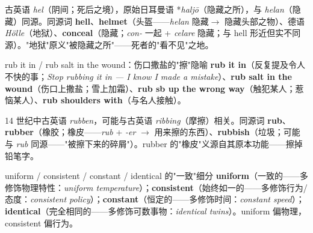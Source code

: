 \documentclass[../main.tex]{subfiles}
\begin{document}
\begin{origin}
古英语 \textit{hel}（阴间；死后之境），原始日耳曼语 *\textit{haljō}（隐藏之所），与 \textit{helan}（隐藏）同源。同源词 \textbf{hell}、\textbf{helmet}（头盔——\textit{helan} 隐藏$\to$ 隐藏头部之物）、德语 \textit{Hölle}（地狱）、\textbf{conceal}（隐藏；\textit{con-} 一起 + \textit{celare} 隐藏；与 hell 形近但实不同源）。"地狱"原义"被隐藏之所"——死者的"看不见"之地。
\end{origin}




\begin{gram}{rub it in / rub salt in the wound：伤口撒盐的"擦"隐喻}
\textbf{rub it in}（反复提及令人不快的事；\textit{Stop rubbing it in — I know I made a mistake}）、\textbf{rub salt in the wound}（伤口上撒盐；雪上加霜）、\textbf{rub sb up the wrong way}（触犯某人；惹恼某人）、\textbf{rub shoulders with}（与名人接触）。
\end{gram}

\begin{origin}
14 世纪中古英语 \textit{rubben}，可能与古英语 \textit{ribbing}（摩擦）相关。同源词 \textbf{rub}、\textbf{rubber}（橡胶；橡皮——\textit{rub} + \textit{-er} $\to$ 用来擦的东西）、\textbf{rubbish}（垃圾；可能与 \textit{rub} 同源——"被擦下来的碎屑"）。rubber 的"橡皮"义源自其原本功能——擦掉铅笔字。
\end{origin}




\begin{lex}{uniform / consistent / constant / identical 的"一致"细分}
\textbf{uniform}（一致的——多修饰物理特性：\textit{uniform temperature}）；\textbf{consistent}（始终如一的——多修饰行为/态度：\textit{consistent policy}）；\textbf{constant}（恒定的——多修饰时间：\textit{constant speed}）；\textbf{identical}（完全相同的——多修饰可数事物：\textit{identical twins}）。uniform 偏物理，consistent 偏行为。
\end{lex}
\end{document}
